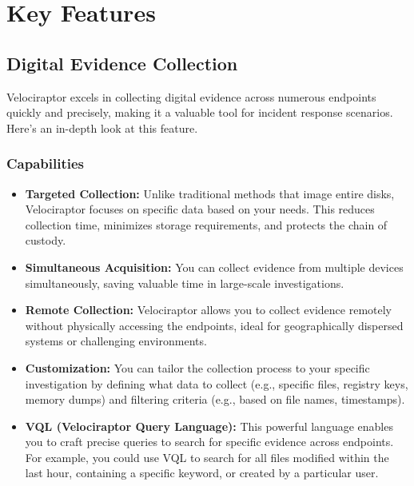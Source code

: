 \documentclass[a4paper, 11pt, oneside]{article} %
\begin{document}
\section{Key Features}

\subsection{Digital Evidence Collection}
Velociraptor excels in collecting digital evidence across numerous endpoints quickly and precisely, making it a valuable tool for incident response scenarios. Here's an in-depth look at this feature.

\subsubsection{Capabilities}
\begin{itemize}
    \item \textbf{Targeted Collection: }Unlike traditional methods that image entire disks, Velociraptor focuses on specific data based on your needs. This reduces collection time, minimizes storage requirements, and protects the chain of custody.
    \item \textbf{Simultaneous Acquisition: }You can collect evidence from multiple devices simultaneously, saving valuable time in large-scale investigations.
    \item \textbf{Remote Collection: } Velociraptor allows you to collect evidence remotely without physically accessing the endpoints, ideal for geographically dispersed systems or challenging environments.
    \item \textbf{Customization: }You can tailor the collection process to your specific investigation by defining what data to collect (e.g., specific files, registry keys, memory dumps) and filtering criteria (e.g., based on file names, timestamps).
    \item \textbf{VQL (Velociraptor Query Language): }
    This powerful language enables you to craft precise queries to search for specific evidence across endpoints. For example, you could use VQL to search for all files modified within the last hour, containing a specific keyword, or created by a particular user.
\end{itemize}
\end{document}
